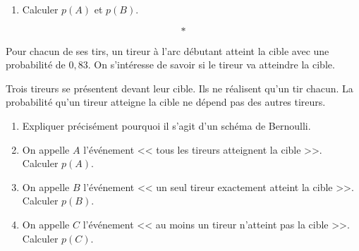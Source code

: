 \documentclass[10pt,french]{book}
\begin{document}
\begin{center}    
\end{center}

\begin{enumerate}[resume]
    \item Calculer $p(A)$ et $p(B)$.
\end{enumerate}\[*\]

\exo Pour chacun de ses tirs, un tireur à l'arc débutant atteint la cible avec une probabilité de $0,83$. On s'intéresse de savoir si le tireur va atteindre la cible.\par
Trois tireurs se présentent devant leur cible. Ils ne réalisent qu'un tir chacun. La probabilité qu'un tireur atteigne la cible ne dépend pas des autres tireurs.

\begin{enumerate}
    \item Expliquer précisément pourquoi il s'agit d'un schéma de Bernoulli.
    \item On appelle $A$ l'événement << tous les tireurs atteignent la cible >>. Calculer $p(A)$.
    \item On appelle $B$ l'événement << un seul tireur exactement atteint la cible >>. Calculer $p(B)$.
    \item On appelle $C$ l'événement << au moins un tireur n'atteint pas la cible >>. Calculer $p(C)$.
\end{enumerate}
\end{document}
